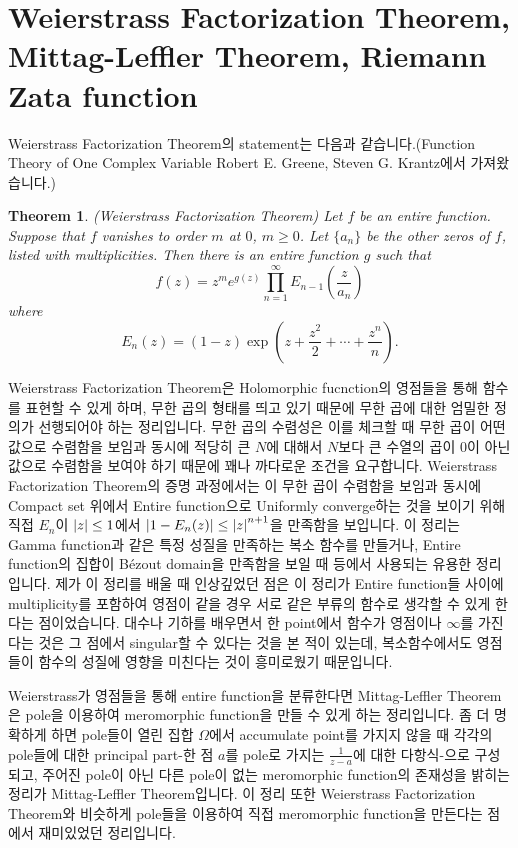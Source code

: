 \documentclass{article}
\newtheorem{theorem}{Theorem}
\begin{document}
\section{Weierstrass Factorization Theorem, Mittag-Leffler Theorem, Riemann Zata function}
Weierstrass Factorization Theorem의 statement는 다음과 같습니다.(Function Theory of One Complex Variable Robert E. Greene, Steven G. Krantz에서 가져왔습니다.)
\begin{theorem}
(Weierstrass Factorization Theorem) Let $f$ be an entire function. Suppose that $f$ vanishes to order $m$ at $0$, $m\geq 0$. Let $\{a_n\}$ be the other zeros of $f$, listed with multiplicities. Then there is an entire function $g$ such that
\begin{equation*}
f(z)=z^m e^{g(z)}\prod\limits_{n=1}^\infty E_{n-1}\left(\frac{z}{a_n}\right)
\end{equation*}
where
\begin{equation*}
E_n(z)=(1-z)\exp\left(z+\frac{z^2}{2}+\cdots+\frac{z^n}{n}\right).
\end{equation*}
\end{theorem}
Weierstrass Factorization Theorem은 Holomorphic fucnction의 영점들을 통해 함수를 표현할 수 있게 하며, 무한 곱의 형태를 띄고 있기 때문에 무한 곱에 대한 엄밀한 정의가 선행되어야 하는 정리입니다. 무한 곱의 수렴성은 이를 체크할 때 무한 곱이 어떤 값으로 수렴함을 보임과 동시에 적당히 큰 $N$에 대해서 $N$보다 큰 수열의 곱이 $0$이 아닌 값으로 수렴함을 보여야 하기 때문에 꽤나 까다로운 조건을 요구합니다. Weierstrass Factorization Theorem의 증명 과정에서는 이 무한 곱이 수렴함을 보임과 동시에 Compact set 위에서 Entire function으로 Uniformly converge하는 것을 보이기 위해 직접 $E_n$이 $\abs{z}\leq 1$에서 $\abs{1-E_n(z)}\leq \abs{z}^{n+1}$을 만족함을 보입니다. 이 정리는 Gamma function과 같은 특정 성질을 만족하는 복소 함수를 만들거나, Entire function의 집합이 B\'ezout domain을 만족함을 보일 때 등에서 사용되는 유용한 정리입니다. 제가 이 정리를 배울 때 인상깊었던 점은 이 정리가 Entire function들 사이에 multiplicity를 포함하여 영점이 같을 경우 서로 같은 부류의 함수로 생각할 수 있게 한다는 점이었습니다. 대수나 기하를 배우면서 한 point에서 함수가 영점이나 $\infty$를 가진다는 것은 그 점에서 singular할 수 있다는 것을 본 적이 있는데, 복소함수에서도 영점들이 함수의 성질에 영향을 미친다는 것이 흥미로웠기 때문입니다.

Weierstrass가 영점들을 통해 entire function을 분류한다면 Mittag-Leffler Theorem은 pole을 이용하여 meromorphic function을 만들 수 있게 하는 정리입니다. 좀 더 명확하게 하면 pole들이 열린 집합 $\Omega$에서 accumulate point를 가지지 않을 때 각각의 pole들에 대한 principal part-한 점 $a$를 pole로 가지는 $\frac{1}{z-a}$에 대한 다항식-으로 구성되고, 주어진 pole이 아닌 다른 pole이 없는 meromorphic function의 존재성을 밝히는 정리가 Mittag-Leffler Theorem입니다. 이 정리 또한 Weierstrass Factorization Theorem와 비슷하게 pole들을 이용하여 직접 meromorphic function을 만든다는 점에서 재미있었던 정리입니다.
\end{document}
